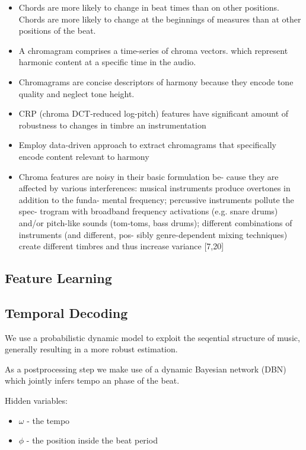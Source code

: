 \documentclass{scrartcl}
\begin{document}
\begin{itemize}
\item Chords are more likely to change in beat times than on other positions. Chords are more likely to change at the beginnings of measures than at other positions of the beat.
\item A chromagram comprises a time-series of chroma vectors. which represent harmonic content at a specific time in the audio.
\item Chromagrams are concise descriptors of harmony because they encode tone quality and neglect tone height.
\item CRP (chroma DCT-reduced log-pitch) features have significant amount of robustness to changes in timbre an instrumentation \cite[Mueller2010]{Mueller2010}
\item Employ data-driven approach to extract chromagrams that specifically encode content relevant to harmony 
\item Chroma features are noisy in their basic formulation be- cause they are affected by various interferences: musical instruments produce overtones in addition to the funda- mental frequency; percussive instruments pollute the spec- trogram with broadband frequency activations (e.g. snare drums) and/or pitch-like sounds (tom-toms, bass drums); different combinations of instruments (and different, pos- sibly genre-dependent mixing techniques) create different timbres and thus increase variance [7,20] \cite{Korzeniowski2016}
\end{itemize}


\subsection{Feature Learning}



\subsection{Temporal Decoding}

We use a probabilistic dynamic model to exploit the seqential structure of music, generally resulting in a more robust estimation.

As a postprocessing step we make use of a dynamic Bayesian network (DBN) which jointly infers tempo an phase of the beat.

\vspace{1em}
Hidden variables: 
\begin{itemize}
\item $\omega$ - the tempo
\item $\phi$ - the position inside the beat period
\end{itemize}
\end{document}
